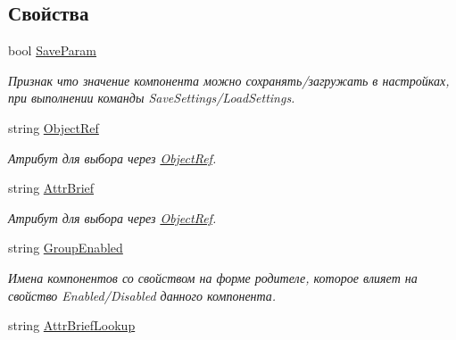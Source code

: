\subsection*{Свойства}
\begin{DoxyCompactItemize}
\item 
bool \mbox{\hyperlink{class_f_b_a_1_1_fast_colored_text_box_f_b_a_aa644cb97611650f04ba43d534c930609}{Save\+Param}}
\begin{DoxyCompactList}\small\item\em Признак что значение компонента можно сохранять/загружать в настройках, при выполнении команды Save\+Settings/\+Load\+Settings. \end{DoxyCompactList}\item 
string \mbox{\hyperlink{class_f_b_a_1_1_fast_colored_text_box_f_b_a_a8eb107d51ea7bd1f3be62e0622492230}{Object\+Ref}}
\begin{DoxyCompactList}\small\item\em Атрибут для выбора через \mbox{\hyperlink{class_f_b_a_1_1_object_ref}{Object\+Ref}}. ~\newline
\end{DoxyCompactList}\item 
string \mbox{\hyperlink{class_f_b_a_1_1_fast_colored_text_box_f_b_a_a1f3daca7f46691dbf6fcf16774cd6dbd}{Attr\+Brief}}
\begin{DoxyCompactList}\small\item\em Атрибут для выбора через \mbox{\hyperlink{class_f_b_a_1_1_object_ref}{Object\+Ref}}. \end{DoxyCompactList}\item 
string \mbox{\hyperlink{class_f_b_a_1_1_fast_colored_text_box_f_b_a_a9bf3f4e6aa2e24971680580e2308e979}{Group\+Enabled}}
\begin{DoxyCompactList}\small\item\em Имена компонентов со свойством на форме родителе, которое влияет на свойство Enabled/\+Disabled данного компонента. ~\newline
\end{DoxyCompactList}\item 
string \mbox{\hyperlink{class_f_b_a_1_1_fast_colored_text_box_f_b_a_ac4dbd7346c26da504468ecd2b71be1f1}{Attr\+Brief\+Lookup}}

\end{DoxyCompactItemize}
